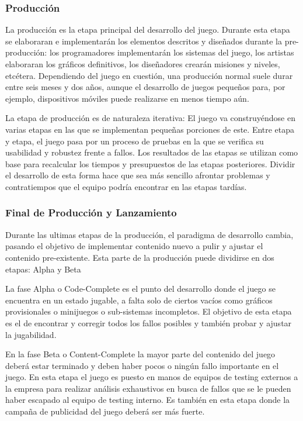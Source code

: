\subsubsection{Producción}
La producción es la etapa principal del desarrollo del juego. Durante esta etapa se elaboraran e implementarán los elementos descritos y diseñados durante la pre-producción: los programadores implementarán los sistemas del juego, los artistas elaboraran los gráficos definitivos, los diseñadores crearán misiones y niveles, etcétera. Dependiendo del juego en cuestión, una producción normal suele durar entre seis meses y dos años, aunque el desarrollo de juegos pequeños para, por ejemplo, dispositivos móviles puede realizarse en menos tiempo aún.

La etapa de producción es de naturaleza iterativa: El juego va construyéndose en varias etapas en las que se implementan pequeñas porciones de este. Entre etapa y etapa, el juego pasa por un proceso de pruebas en la que se verifica su usabilidad y robustez frente a fallos. Los resultados de las etapas se utilizan como base para recalcular los tiempos y presupuestos de las etapas posteriores. Dividir el desarrollo de esta forma hace que sea más sencillo afrontar problemas y contratiempos que el equipo podría encontrar en las etapas tardías.

\subsubsection{Final de Producción y Lanzamiento}
Durante las ultimas etapas de la producción, el paradigma de desarrollo cambia, pasando el objetivo de implementar contenido nuevo a pulir y ajustar el contenido pre-existente. Esta parte de la producción puede dividirse en dos etapas: Alpha y Beta

La fase Alpha o Code-Complete es el punto del desarrollo donde el juego se encuentra en un estado jugable, a falta solo de ciertos vacíos como gráficos provisionales o minijuegos o sub-sistemas incompletos. El objetivo de esta etapa es el de encontrar y corregir todos los fallos posibles y también probar y ajustar la jugabilidad.

En la fase Beta o Content-Complete la mayor parte del contenido del juego deberá estar terminado y deben haber pocos o ningún fallo importante en el juego. En esta etapa el juego es puesto en manos de equipos de testing externos a la empresa para realizar análisis exhaustivos en busca de fallos que se le pueden haber escapado al equipo de testing interno. Es también en esta etapa donde la campaña de publicidad del juego deberá ser más fuerte.

